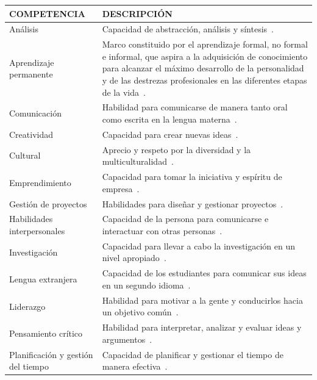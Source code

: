\begin{landscape}
\pagestyle{empty}
  \begin{center}
\begin{longtable}{| L{6cm} | L{16cm} |}
    \hline
    COMPETENCIA & DESCRIPCIÓN \\
    \hline
    \hline
    Análisis & Capacidad de abstracción, análisis y síntesis~\cite{gonzalez2005tuning}.\\
    \hline
    Aprendizaje permanente & Marco constituido por el aprendizaje formal, no formal e informal, que aspira a la adquisición de conocimiento para alcanzar el máximo desarrollo de la personalidad y de las destrezas profesionales en las diferentes etapas de la vida~\cite{bernheim2010educacion}. \\
    \hline
    Comunicación & Habilidad para comunicarse de manera tanto oral como escrita en la lengua materna~\cite{gonzalez2005tuning}. \\
    \hline
    Creatividad & Capacidad para crear nuevas ideas~\cite{gonzalez2005tuning}. \\
    \hline
    Cultural & Aprecio y respeto por la diversidad y la multiculturalidad~\cite{gonzalez2005tuning}. \\
    \hline
    Emprendimiento & Capacidad para tomar la iniciativa y espíritu de empresa~\cite{gonzalez2005tuning}. \\
    \hline
    Gestión de proyectos & Habilidades para diseñar y gestionar proyectos~\cite{gonzalez2005tuning}. \\
    \hline
    Habilidades interpersonales & Capacidad de la persona para comunicarse e interactuar con otras personas~\cite{gonzalez2005tuning}. \\ %
    \hline    
    Investigación & Capacidad para llevar a cabo la investigación en un nivel apropiado~\cite{gonzalez2005tuning}.  \\
    \hline 
    Lengua extranjera & Capacidad de los estudiantes para comunicar sus ideas en un segundo idioma~\cite{gass2013second}. \\
    \hline
    Liderazgo & Habilidad para motivar a la gente y conducirlos hacia un objetivo común~\cite{gonzalez2005tuning}. \\
    \hline
    Pensamiento crítico & Habilidad para interpretar, analizar y evaluar ideas y argumentos~\cite{fisher2011critical}. \\
    \hline
    Planificación y gestión del tiempo & Capacidad de planificar y gestionar el tiempo de manera efectiva~\cite{gonzalez2005tuning}. \\

\end{longtable}
\end{center}
\end{landscape}
